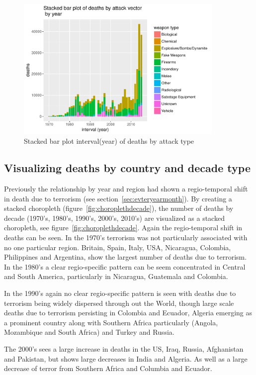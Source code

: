 \begin{figure}[t]
\includegraphics[width=10cm]{Peters_experiment_markdown_files/figure-latex/unnamed-chunk-9-1.pdf}
\caption{Stacked bar plot interval(year) of deaths by attack type}
\label{fig:stackbaryearweaptype}
\centering
\end{figure}

\subsection{Visualizing deaths by country and decade 
type}\label{viewing-deaths-by-attack-vector-type}

Previously the relationship by year and region had shown a regio-temporal shift in death due to terrorism (see section~\ref{sec:evteryearmonth}). By creating a stacked choropleth (figure~\ref{fig:choroplethdecade}), the number of deaths by decade (1970's, 1980's, 1990's, 2000's, 2010's) are visualized as a stacked choropleth, see figure~\ref{fig:choroplethdecade}. Again the regio-temporal shift in deaths can be seen. In the 1970's terrorism was not particularly associated with no one particular region. Britain, Spain, Italy, USA, Nicaragua, Colombia, Philippines and Argentina, show the largest number of deaths due to terrorism. In the 1980's a clear regio-specific pattern can be seem concentrated in Central and South America, particularly in Nicaragua, Guatemala and Colombia.

In the 1990's again no clear regio-specific pattern is seen with deaths due to terrorism being widely dispersed through out the World, though large scale deaths due to terrorism persisting in Colombia and Ecuador, Algeria emerging as a prominent country along with Southern Africa particularly (Angola, Mozambique and  South Africa) and Turkey and Russia. 

The 2000's sees a large increase in deaths in the US, Iraq, Russia, Afghanistan and Pakistan, but shows large decreases in India and Algeria. As well as a large decrease of terror from Southern Africa and Columbia and Ecuador.

